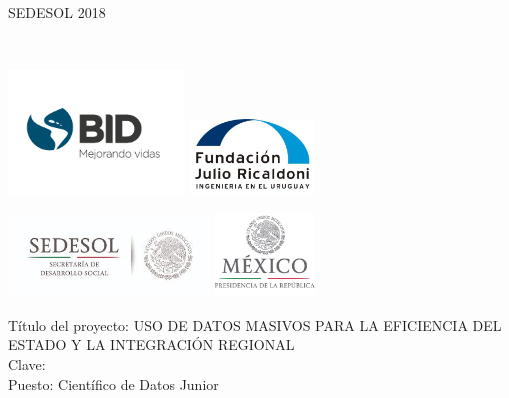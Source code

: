 \begin{center}
SEDESOL 2018
\vspace{0.1cm}

  \begin{center}



      \Large \MyName \\\vspace{5mm}
\begin{multicols}{2}
\includegraphics[width=0.35\textwidth]{images/bid}
\includegraphics[width=0.25\textwidth]{images/LOGO_FJR}
\end{multicols}
\begin{multicols}{2}
\includegraphics[width=0.4\textwidth]{images/sedesol}
\includegraphics[width=0.2\textwidth]{images/presidencia}
\end{multicols}


  \vspace{2mm}

  \end{center}
  \vspace{0.3cm}
  {\Large Título del proyecto: USO DE DATOS MASIVOS PARA LA EFICIENCIA DEL ESTADO Y LA INTEGRACIÓN REGIONAL\\}
    {\large Clave: \Contrato}\\
  \vspace{0.5cm}
  \Large Puesto: Científico de Datos Junior\\
  \vspace{1.0cm}


\end{center}
